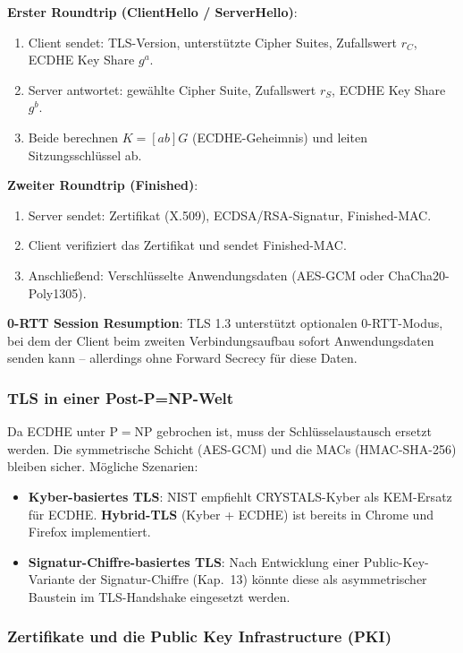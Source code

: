 ﻿\documentclass[a4paper,12pt]{scrreprt}
\theoremstyle{definition}
\begin{document}
\textbf{Erster Roundtrip (ClientHello / ServerHello)}:
\begin{enumerate}
    \item Client sendet: TLS-Version, unterstützte Cipher Suites, Zufallswert $r_C$, ECDHE Key Share $g^a$.
    \item Server antwortet: gewählte Cipher Suite, Zufallswert $r_S$, ECDHE Key Share $g^b$.
    \item Beide berechnen $K = [ab]G$ (ECDHE-Geheimnis) und leiten Sitzungsschlüssel ab.
\end{enumerate}

\textbf{Zweiter Roundtrip (Finished)}:
\begin{enumerate}
    \item Server sendet: Zertifikat (X.509), ECDSA/RSA-Signatur, Finished-MAC.
    \item Client verifiziert das Zertifikat und sendet Finished-MAC.
    \item Anschließend: Verschlüsselte Anwendungsdaten (AES-GCM oder ChaCha20-Poly1305).
\end{enumerate}

\textbf{0-RTT Session Resumption}: TLS 1.3 unterstützt optionalen 0-RTT-Modus, bei dem der Client beim zweiten Verbindungsaufbau sofort Anwendungsdaten senden kann -- allerdings ohne Forward Secrecy für diese Daten.

\subsubsection{TLS in einer Post-P=NP-Welt}

Da ECDHE unter $\mathrm{P}=\mathrm{NP}$ \cite{Epp26a} gebrochen ist, muss der Schlüsselaustausch ersetzt werden. Die symmetrische Schicht (AES-GCM) und die MACs (HMAC-SHA-256) bleiben sicher. Mögliche Szenarien:

\begin{itemize}
    \item \textbf{Kyber-basiertes TLS}: NIST empfiehlt CRYSTALS-Kyber \cite{ABD+22} als KEM-Ersatz für ECDHE. \textbf{Hybrid-TLS} (Kyber + ECDHE) ist bereits in Chrome und Firefox implementiert.
    \item \textbf{Signatur-Chiffre-basiertes TLS}: Nach Entwicklung einer Public-Key-Variante der Signatur-Chiffre (Kap.~13) könnte diese als asymmetrischer Baustein im TLS-Handshake eingesetzt werden.
\end{itemize}

\subsubsection{Zertifikate und die Public Key Infrastructure (PKI)}
\end{document}
